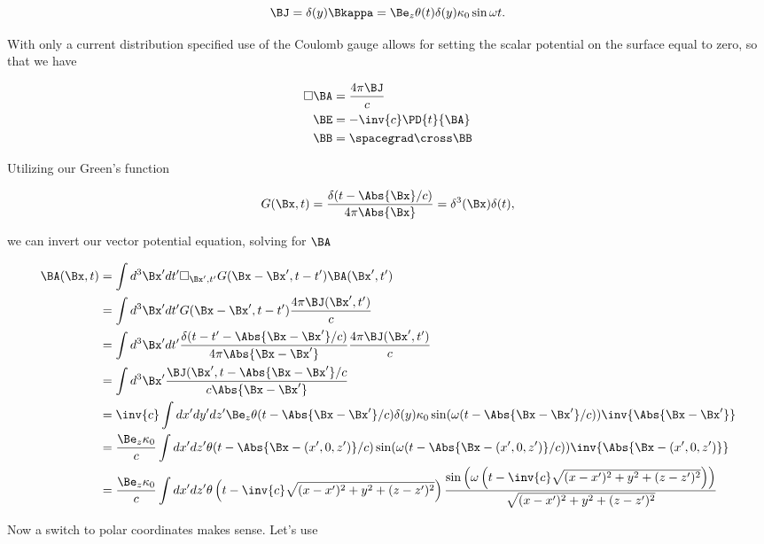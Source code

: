 \begin{equation}\label{eqn:relElectroDynProblemSet5P1:n}
\BJ = \delta(y) \Bkappa = \Be_z \theta(t) \delta(y) \kappa_0 \sin\omega t.
\end{equation}

With only a current distribution specified use of the Coulomb gauge allows for setting the scalar potential on the surface equal to zero, so that we have

\begin{align}\label{eqn:relElectroDynProblemSet5P1:n}
\square \BA &= \frac{4 \pi \BJ}{c} \\
\BE &= - \inv{c} \PD{t}{\BA} \\
\BB &= \spacegrad \cross \BB
\end{align}

Utilizing our Green's function 

\begin{equation}\label{eqn:relElectroDynProblemSet5P1:n}
G(\Bx, t) = \frac{\delta(t - \Abs{\Bx}/c)}{4 \pi \Abs{\Bx}} = \delta^3(\Bx)\delta(t),
\end{equation}

we can invert our vector potential equation, solving for $\BA$

\begin{align*}
\BA(\Bx, t) 
&= \int d^3 \Bx' dt' \square_{\Bx', t'} G(\Bx - \Bx', t - t') \BA(\Bx', t') \\
&= \int d^3 \Bx' dt' G(\Bx - \Bx', t - t') \frac{4 \pi \BJ(\Bx', t')}{c} \\
&= \int d^3 \Bx' dt' 
\frac{\delta(t - t' - \Abs{\Bx -\Bx'}/c)}{4 \pi \Abs{\Bx - \Bx'}}
\frac{4 \pi \BJ(\Bx', t')}{c} \\
&= \int d^3 \Bx' 
\frac{\BJ(\Bx', t - \Abs{\Bx - \Bx'}/c}{c \Abs{\Bx - \Bx'}} \\
&= \inv{c} \int dx' dy' dz'
\Be_z \theta(t - \Abs{\Bx -\Bx'}/c) \delta(y) \kappa_0 \sin(\omega(t - \Abs{\Bx -\Bx'}/c))
\inv{\Abs{\Bx - \Bx'}} \\
&= \frac{
\Be_z \kappa_0
}{c} \int dx' dz'
\theta(t - \Abs{\Bx -(x', 0, z')}/c) 
\sin(\omega(t - \Abs{\Bx -(x', 0, z')}/c))
\inv{\Abs{\Bx - (x', 0, z')}} \\
&= \frac{
\Be_z \kappa_0
}{c} \int dx' dz'
\theta\left(t - \inv{c} \sqrt{(x-x')^2 + y^2 + (z-z')^2}\right) 
\frac{\sin\left(\omega\left(t - \inv{c} \sqrt{(x-x')^2 + y^2 + (z-z')^2}\right)\right)}{\sqrt{(x-x')^2 + y^2 + (z-z')^2}}
\end{align*}

Now a switch to polar coordinates makes sense.  Let's use

